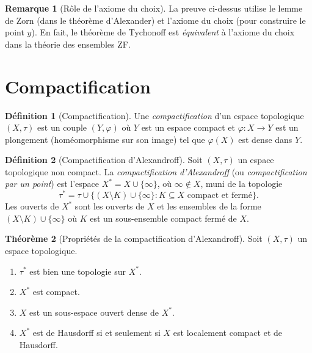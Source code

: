 \documentclass[12pt,a4paper,openany]{book}
\theoremstyle{definition}
\newtheorem{definition}{Définition}[chapter]
\theoremstyle{cours}
\newtheorem{theoreme}{Théorème}[chapter]
\theoremstyle{coursnormal}
\newtheorem{remarque}[theoreme]{Remarque}
\begin{document}
\begin{remarque}[Rôle de l'axiome du choix]\label{rem:rem:tychonoff-AC}
  La preuve ci-dessus utilise le lemme de Zorn (dans le théorème d'Alexander)
  et l'axiome du choix (pour construire le point $y$). En fait, le théorème de
  Tychonoff est \emph{équivalent} à l'axiome du choix dans la théorie des
  ensembles ZF.
\end{remarque}

\section{Compactification}\label{sec:compactification}

\begin{definition}[Compactification]\label{def:compactification}
  Une \emph{compactification} d'un espace topologique
  $(X,\tau)$ est un couple $(Y,\varphi)$ où $Y$ est un espace compact et
  $\varphi\colon X\to Y$ est un plongement (homéomorphisme sur son image) tel
  que $\varphi(X)$ est dense dans $Y$.
\end{definition}

\begin{definition}[Compactification d'Alexandroff]\label{def:alexandroff}
  Soit $(X,\tau)$ un espace topologique non compact.
  La \emph{compactification d'Alexandroff} (ou \emph{compactification par un
  point}) est l'espace $X^*=X\cup\{\infty\}$, où $\infty\notin X$, muni de la
  topologie
  \[
    \tau^* = \tau \cup \{(X\setminus K)\cup\{\infty\} : K\subseteq X
    \text{ compact et fermé}\}.
  \]
  Les ouverts de $X^*$ sont les ouverts de $X$ et les ensembles de la forme
  $(X\setminus K)\cup\{\infty\}$ où $K$ est un sous-ensemble compact fermé
  de $X$.
\end{definition}

\begin{theoreme}[Propriétés de la compactification d'Alexandroff]\label{thm:alexandroff-proprietes}
  Soit $(X,\tau)$ un espace topologique.
  \begin{enumerate}
    \item\label{it:alex1} $\tau^*$ est bien une topologie sur $X^*$.
    \item\label{it:alex2} $X^*$ est compact.
    \item\label{it:alex3} $X$ est un sous-espace ouvert dense de $X^*$.
    \item\label{it:alex4} $X^*$ est de Hausdorff si et seulement si $X$ est
      localement compact et de Hausdorff.
  \end{enumerate}
\end{theoreme}
\end{document}
